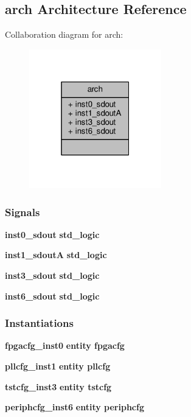 \subsection{arch Architecture Reference}
\label{classcfg__top_1_1arch}


Collaboration diagram for arch\+:\nopagebreak
\begin{figure}[H]
\begin{center}
\leavevmode
\includegraphics[width=163pt]{dc/dd4/classcfg__top_1_1arch__coll__graph}
\end{center}
\end{figure}
\subsubsection*{Signals}
 \begin{DoxyCompactItemize}
\item 
{\bf inst0\+\_\+sdout} {\bfseries \textcolor{comment}{std\+\_\+logic}\textcolor{vhdlchar}{ }} 
\item 
{\bf inst1\+\_\+sdoutA} {\bfseries \textcolor{comment}{std\+\_\+logic}\textcolor{vhdlchar}{ }} 
\item 
{\bf inst3\+\_\+sdout} {\bfseries \textcolor{comment}{std\+\_\+logic}\textcolor{vhdlchar}{ }} 
\item 
{\bf inst6\+\_\+sdout} {\bfseries \textcolor{comment}{std\+\_\+logic}\textcolor{vhdlchar}{ }} 
\end{DoxyCompactItemize}
\subsubsection*{Instantiations}
 \begin{DoxyCompactItemize}
\item 
{\bf fpgacfg\+\_\+inst0}  {\bfseries entity fpgacfg}   
\item 
{\bf pllcfg\+\_\+inst1}  {\bfseries entity pllcfg}   
\item 
{\bf tstcfg\+\_\+inst3}  {\bfseries entity tstcfg}   
\item 
{\bf periphcfg\+\_\+inst6}  {\bfseries entity periphcfg}   
\end{DoxyCompactItemize}


